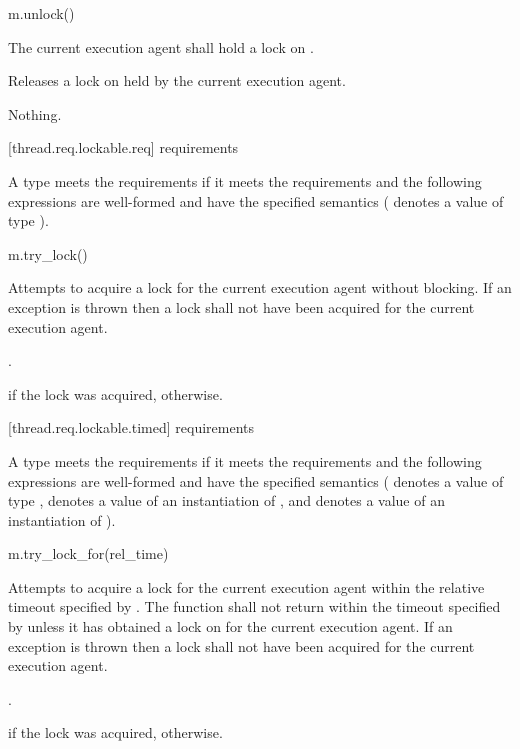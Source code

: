 \begin{itemdecl}
m.unlock()
\end{itemdecl}

\begin{itemdescr}
\pnum
\requires The current execution agent shall hold a lock on .

\pnum
\effects Releases a lock on  held by the current execution agent.

\pnum
\throws Nothing.
\end{itemdescr}

[thread.req.lockable.req]{ requirements}

\pnum
A type  meets the  requirements if it meets the 
requirements and the following expressions are well-formed and have the specified semantics
( denotes a value of type ).

\begin{itemdecl}
m.try_lock()
\end{itemdecl}

\begin{itemdescr}
\pnum
\effects Attempts to acquire a lock for the current execution agent without blocking. If an
exception is thrown then a lock shall not have been acquired for the current execution agent.

\pnum
\returntype {}.

\pnum
\returns {} if the lock was acquired,  otherwise.
\end{itemdescr}

[thread.req.lockable.timed]{ requirements}

\pnum
A type  meets the  requirements if it meets the 
requirements and the following expressions are well-formed and have the specified semantics
( denotes a value of type ,  denotes a value of an
instantiation of , and  denotes a value
of an instantiation of ).

\begin{itemdecl}
m.try_lock_for(rel_time)
\end{itemdecl}

\begin{itemdescr}
\pnum
\effects Attempts to acquire a lock for the current execution agent within the relative
timeout specified by . The function shall not return
within the timeout specified by  unless it has obtained a lock on 
for the current execution agent. If an exception is thrown then a lock shall not have been
acquired for the current execution agent.

\pnum
\returntype {}.

\pnum
\returns {} if the lock was acquired,  otherwise.
\end{itemdescr}

